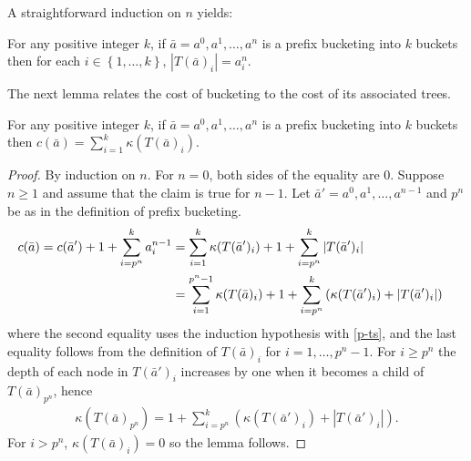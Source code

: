 \documentclass[unicode,review]{siamart1116}
\newcommand{\natInt}[2]{ \left\{ #1, \dotsc, #2 \right\} }
\numberwithin{theorem}{section}
\begin{document}
A straightforward induction on $n$ yields:

\begin{proposition}\label{p-ts}
For any positive integer $k$, if $\bar{a} = a^0,a^1,\dotsc,a^n$ is a prefix bucketing into $k$ buckets
then for each $i \in \natInt{1}{k}$, $|T(\bar{a})_i| = a^n_i$.
\end{proposition}

The next lemma relates the cost of bucketing to the cost of its associated trees.
\begin{lemma}\label{l-tc}
For any positive integer $k$, if $\bar{a} = a^0,a^1,\dotsc,a^n$ is a prefix bucketing into $k$ buckets then $c(\bar{a})=\sum_{i=1}^k \kappa(T(\bar{a})_i)$.
\end{lemma}
\iffalse
\begin{proof}
By induction it suffices to show that
$\kappa(T(\bar{a}))-\kappa(T(\bar{a}'))=c(\bar{a})-c(\bar{a}')$, where $\kappa(T(\bar{a})) = \sum_{i=1}^k \kappa(T(\bar{a})_i)$. By definition of $c(\cdot)$ and \cref{p-ts},
$c(\bar{a})-c(\bar{a}')=a^n_{p^n}=|T(\bar{a})_{p^n}|$.
So it suffices to show $\kappa(T(\bar{a}))-\kappa(T(\bar{a}'))=|T(\bar{a})_{p^n}|$.
By the definition of $\kappa(\cdot)$ and the inductive definition of 
$T(\bar{a})$, 
$$\kappa(T(\bar{a}))-\kappa(T(\bar{a}'))= \kappa(T(\bar{a}_{p^n}))-\sum_{i \geq p^n} \kappa(T(\bar{a}'_{i})).$$ 
This equals $|T(\bar{a})|_{p^n}$, as required, since each node
of $\bigcup_{i \geq p^n} T(\bar{a}')_i$ corresponds (bijectively) to a 
non-root of  $T(\bar{a})_{p^n}$ of depth one greater.
\end{proof}
\fi
\begin{proof}
By induction on $n$. For $n=0$, both sides of the equality are 0.  Suppose $n \geq 1$
and assume that the claim is true for $n-1$.  Let $\bar{a}'=a^0,a^1,\dotsc,a^{n-1}$ and $p^n$ be as in the definition of prefix bucketing.
\begin{align*}
c(\bar{a}) = c(\bar{a}') + 1 + \sum_{i=p^n}^k a^{n-1}_i
&= \sum_{i=1}^k \kappa(T(\bar{a}')_i) + 1 + \sum_{i=p^n}^k |T(\bar{a}')_i| \cr
&= \sum_{i=1}^{p^n-1} \kappa(T(\bar{a})_i) + 1 + \sum_{i=p^n}^k \left(\kappa(T(\bar{a}')_i) + |T(\bar{a}')_i|\right)
\end{align*}
where the second equality uses the induction hypothesis with \cref{p-ts},
and the last equality follows from the definition of $T(\bar{a})_i$ for $i=1,\dotsc,p^n-1$.
For $i\ge p^n$ the depth of each node in $T(\bar{a}')_i$ increases by one when it becomes a child of $T(\bar{a})_{p^n}$, hence
\begin{align*}
\kappa(T(\bar{a})_{p^n}) =  1 + \sum_{i=p^n}^k \left(\kappa(T(\bar{a}')_i) + |T(\bar{a}')_i|\right).
\end{align*}
For $i > p^n$, $\kappa(T(\bar{a})_i) = 0$ so the lemma follows.
\end{proof}
\end{document}
